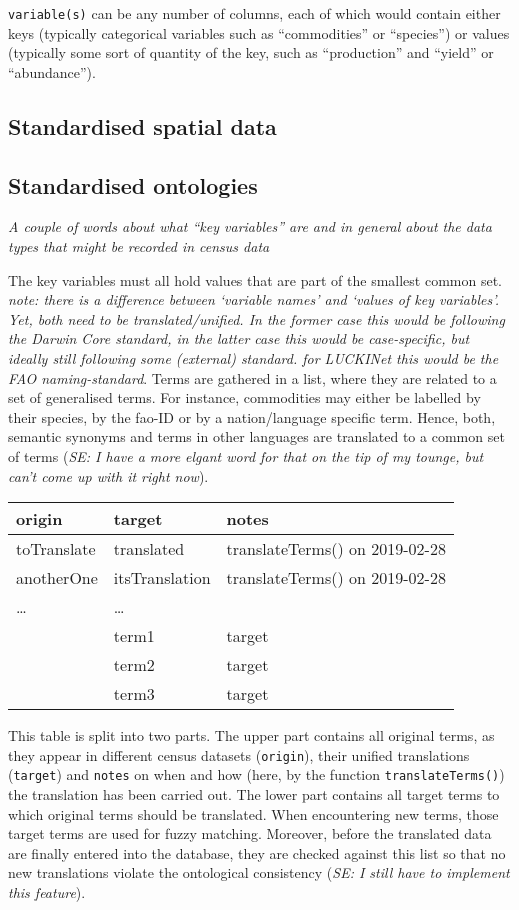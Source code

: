 \documentclass[12pt,]{article}
\begin{document}
\texttt{variable(s)} can be any number of columns, each of which would contain either keys (typically categorical variables such as ``commodities'' or ``species'') or values (typically some sort of quantity of the key, such as ``production'' and ``yield'' or ``abundance'').

\hypertarget{standardised-spatial-data}{%
\subsection{Standardised spatial data}\label{standardised-spatial-data}}

\hypertarget{standardised-ontologies}{%
\subsection{Standardised ontologies}\label{standardised-ontologies}}

\emph{A couple of words about what ``key variables'' are and in general about the data types that might be recorded in census data}

The key variables must all hold values that are part of the smallest common set.
\emph{note: there is a difference between `variable names' and `values of key variables'. Yet, both need to be translated/unified. In the former case this would be following the Darwin Core standard, in the latter case this would be case-specific, but ideally still following some (external) standard. for LUCKINet this would be the FAO naming-standard}.
Terms are gathered in a list, where they are related to a set of generalised terms.
For instance, commodities may either be labelled by their species, by the fao-ID or by a nation/language specific term.
Hence, both, semantic synonyms and terms in other languages are translated to a common set of terms (\emph{SE: I have a more elgant word for that on the tip of my tounge, but can't come up with it right now}).

\begin{longtable}[]{@{}lll@{}}
\toprule
origin & target & notes\tabularnewline
\midrule
\endhead
toTranslate & translated & translateTerms() on 2019-02-28\tabularnewline
anotherOne & itsTranslation & translateTerms() on 2019-02-28\tabularnewline
\ldots{} & \ldots{} &\tabularnewline
& term1 & target\tabularnewline
& term2 & target\tabularnewline
& term3 & target\tabularnewline
\bottomrule
\end{longtable}

This table is split into two parts. The upper part contains all original terms, as they appear in different census datasets (\texttt{origin}), their unified translations (\texttt{target}) and \texttt{notes} on when and how (here, by the function \texttt{translateTerms()}) the translation has been carried out.
The lower part contains all target terms to which original terms should be translated. When encountering new terms, those target terms are used for fuzzy matching.
Moreover, before the translated data are finally entered into the database, they are checked against this list so that no new translations violate the ontological consistency (\emph{SE: I still have to implement this feature}).
\end{document}
